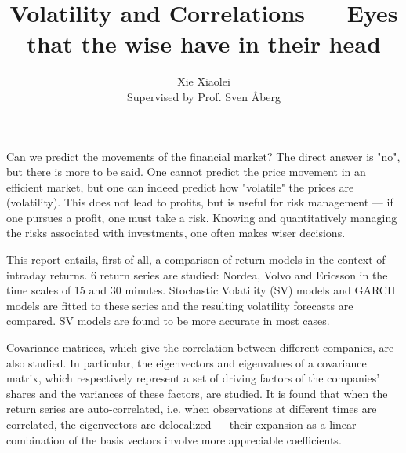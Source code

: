 \documentclass{article}
\author{Xie Xiaolei \\
Supervised by Prof. Sven \AA berg}
\title{Volatility and Correlations --- Eyes that the wise have in their head}
\begin{document}
\maketitle

Can we predict the movements of the financial market? The direct answer is "no", but there is more to be said. One cannot predict the price movement in an efficient market, but one can indeed predict how "volatile" the prices are (volatility). This does not lead to profits, but is useful for risk management --- if one pursues a profit, one must take a risk. Knowing and quantitatively managing the risks associated with investments, one often makes wiser decisions.

This report entails, first of all, a comparison of return models in the context of intraday returns. 6 return series are studied: Nordea, Volvo and Ericsson in the time scales of 15 and 30 minutes. Stochastic Volatility (SV) models and GARCH models are fitted to these series and the resulting volatility forecasts are compared. SV models are found to be more accurate in most cases.

Covariance matrices, which give the correlation between different companies, are also studied. In particular, the eigenvectors and eigenvalues of a covariance matrix, which respectively represent a set of driving factors of the companies' shares and the variances of these factors, are studied. It is found that when the return series are auto-correlated, i.e. when observations at different times are correlated, the eigenvectors are delocalized --- their expansion as a linear combination of the basis vectors involve more appreciable coefficients.
\end{document}
